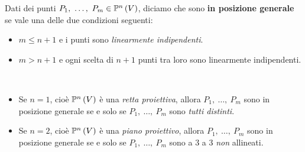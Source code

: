 \begin{define}
	Dati dei punti $P_1,\ \ldots,\ P_m\in\proj{V}$, diciamo che sono \textbf{in posizione generale} se vale una delle due condizioni seguenti:
	\begin{itemize}
		\item $m\leq n+1$ e i punti sono \textit{linearmente indipendenti}.
		\item $m>n+1$ e ogni scelta di $n+1$ punti tra loro sono linearmente indipendenti.
	\end{itemize}
\end{define}
\begin{example}~{}
		\begin{itemize}
		\item Se $n=1$, cioè $\proj{V}$ è una \textit{retta proiettiva}, allora $P_1,\ \ldots,\ P_m$ sono in posizione generale se e solo se $P_1,\ \ldots,\ P_m$ sono \textit{tutti distinti}.
		\item Se $n=2$, cioè $\proj{V}$ è una \textit{piano proiettivo}, allora $P_1,\ \ldots,\ P_m$ sono in posizione generale se e solo se $P_1,\ \ldots,\ P_m$ sono a $3$ a $3$ \textit{non} allineati.
	\end{itemize}
\end{example}
